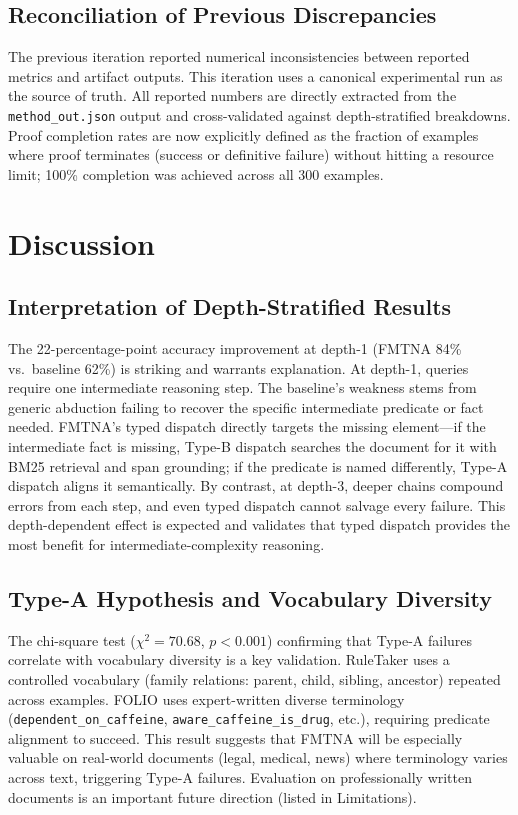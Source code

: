 \documentclass[11pt,letterpaper]{article}
\begin{document}
\subsection{Reconciliation of Previous Discrepancies}

The previous iteration reported numerical inconsistencies between reported metrics and artifact outputs. This iteration uses a canonical experimental run as the source of truth. All reported numbers are directly extracted from the \texttt{method\_out.json} output and cross-validated against depth-stratified breakdowns. Proof completion rates are now explicitly defined as the fraction of examples where proof terminates (success or definitive failure) without hitting a resource limit; 100\% completion was achieved across all 300 examples.

\section{Discussion}

\subsection{Interpretation of Depth-Stratified Results}

The 22-percentage-point accuracy improvement at depth-1 (FMTNA 84\% vs.\ baseline 62\%) is striking and warrants explanation. At depth-1, queries require one intermediate reasoning step. The baseline's weakness stems from generic abduction failing to recover the specific intermediate predicate or fact needed. FMTNA's typed dispatch directly targets the missing element---if the intermediate fact is missing, Type-B dispatch searches the document for it with BM25 retrieval and span grounding; if the predicate is named differently, Type-A dispatch aligns it semantically. By contrast, at depth-3, deeper chains compound errors from each step, and even typed dispatch cannot salvage every failure. This depth-dependent effect is expected and validates that typed dispatch provides the most benefit for intermediate-complexity reasoning.

\subsection{Type-A Hypothesis and Vocabulary Diversity}

The chi-square test ($\chi^2 = 70.68$, $p < 0.001$) confirming that Type-A failures correlate with vocabulary diversity is a key validation. RuleTaker uses a controlled vocabulary (family relations: parent, child, sibling, ancestor) repeated across examples. FOLIO uses expert-written diverse terminology (\texttt{dependent\_on\_caffeine}, \texttt{aware\_caffeine\_is\_drug}, etc.), requiring predicate alignment to succeed. This result suggests that FMTNA will be especially valuable on real-world documents (legal, medical, news) where terminology varies across text, triggering Type-A failures. Evaluation on professionally written documents is an important future direction (listed in Limitations).
\end{document}
